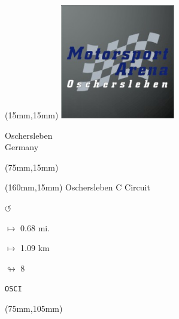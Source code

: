 \begin{textblock*}{50mm}(15mm,15mm)%
\includegraphics[width=50mm]{LG/2015-05-20_00090.png}
\par Oschersleben\\ Germany
\end{textblock*}
\begin{textblock*}{80mm}(75mm,15mm)%
\end{textblock*}
\begin{textblock*}{40mm}(160mm,15mm)%
Oschersleben C Circuit
\par \Huge$\circlearrowleft$
\Large
\par$\mapsto$ 0.68 mi.
\par$\mapsto$ 1.09 km
\par$\looparrowright$ 8
\par\hfill\tiny\tt OSCI\\
\end{textblock*}
\begin{textblock*}{80mm}(75mm,105mm)%
\end{textblock*}
